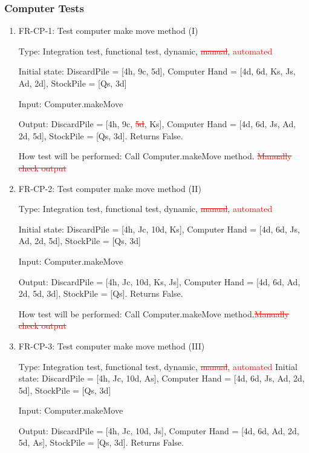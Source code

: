 \documentclass[12pt, titlepage]{article}
\begin{document}
\subsubsection{Computer Tests}
\begin{enumerate}
    \item{FR-CP-1: Test computer make move method (I)}
    
    Type: Integration test, functional test, dynamic, \textcolor{red}{\sout{manual}}, \textcolor{red}{automated} 
    					
    Initial state: DiscardPile = [4h, 9c, 5d], Computer Hand = [4d, 6d, Ks, Js, Ad, 2d], StockPile = [Qs, 3d]
    		
    Input: Computer.makeMove
    
    Output: DiscardPile = [4h, 9c, \textcolor{red}{\sout{5d}}, Ks], Computer Hand = [4d, 6d, Js, Ad, 2d, 5d], StockPile = [Qs, 3d]. Returns False.
    					
    How test will be performed: Call Computer.makeMove method. \textcolor{red}{\sout{Manually check output}}
    
    \item{FR-CP-2: Test computer make move method (II)}
    
    Type: Integration test, functional test, dynamic, \textcolor{red}{\sout{manual}}, \textcolor{red}{automated} 
    					
    Initial state: DiscardPile = [4h, Jc, 10d, Ks], Computer Hand = [4d, 6d, Js, Ad, 2d, 5d], StockPile = [Qs, 3d]
    		
    Input: Computer.makeMove
    
    Output: DiscardPile = [4h, Jc, 10d, Ks, Js], Computer Hand = [4d, 6d, Ad, 2d, 5d, 3d], StockPile = [Qs]. Returns False.
    					
    How test will be performed: Call Computer.makeMove method.\textcolor{red}{\sout{Manually check output}}
    
    \item{FR-CP-3: Test computer make move method (III)}
    
    Type: Integration test, functional test, dynamic, \textcolor{red}{\sout{manual}}, \textcolor{red}{automated} 
    Initial state: DiscardPile = [4h, Jc, 10d, As], Computer Hand = [4d, 6d, Js, Ad, 2d, 5d], StockPile = [Qs, 3d]
    		
    Input: Computer.makeMove
    
    Output: DiscardPile = [4h, Jc, 10d, Js], Computer Hand = [4d, 6d, Ad, 2d, 5d, As], StockPile = [Qs, 3d]. Returns False.
    					

\end{enumerate}
\end{document}
